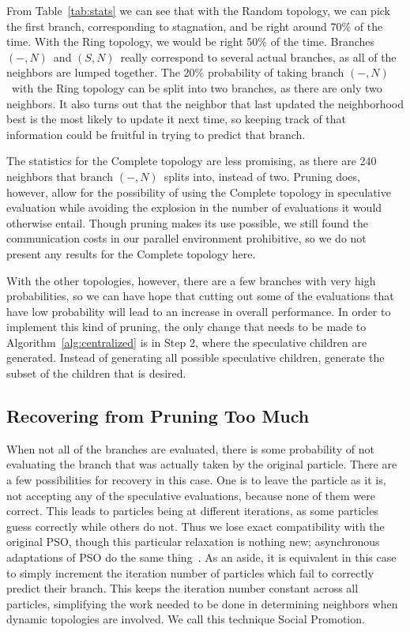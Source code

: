 \documentclass[journal,letterpaper]{IEEEtran}
\newcommand{\alg}[1]{Algorithm~\ref{alg:#1}}
\providecommand{\casepN}{\ensuremath{(-,N)}}
\providecommand{\casexN}{\ensuremath{(S,N)}}
\begin{document}
From Table~\ref{tab:stats} we can see that with the Random topology, we can
pick the first branch, corresponding to stagnation, and be right around 70\% of
the time.  With the Ring topology, we would be right 50\% of the time.
Branches \casepN\ and \casexN\ really correspond to several actual branches, as
all of the neighbors are lumped together.  The 20\% probability of taking
branch \casepN\ with the Ring topology can be split into two branches, as there
are only two neighbors.  It also turns out that the neighbor that last updated
the neighborhood best is the most likely to update it next time, so keeping
track of that information could be fruitful in trying to predict that branch.

The statistics for the Complete topology are less promising, as there are 240
neighbors that branch \casepN\ splits into, instead of two.  Pruning does,
however, allow for the possibility of using the Complete topology in
speculative evaluation while avoiding the explosion in the number of
evaluations it would otherwise entail.  Though pruning makes its use possible,
we still found the communication costs in our parallel environment prohibitive,
so we do not present any results for the Complete topology here.

With the other topologies, however, there are a few branches with very high
probabilities, so we can have hope that cutting out some of the evaluations
that have low probability will lead to an increase in overall performance.  In
order to implement this kind of pruning, the only change that needs to be made
to \alg{centralized} is in Step 2, where the speculative children are
generated.  Instead of generating all possible speculative children, generate
the subset of the children that is desired.

\subsection{Recovering from Pruning Too Much}
\label{sec:wrong}

When not all of the branches are evaluated, there is some probability of not
evaluating the branch that was actually taken by the original particle.  There
are a few possibilities for recovery in this case.  One is to leave the
particle as it is, not accepting any of the speculative evaluations, because
none of them were correct.  This leads to particles being at different
iterations, as some particles guess correctly while others do not.  Thus we
lose exact compatibility with the original PSO, though this particular
relaxation is nothing new; asynchronous adaptations of PSO do the same
thing~\cite{koh-2006-parallel-asynchronous-pso}.  As an aside, it is equivalent
in this case to simply increment the iteration number of particles which fail
to correctly predict their branch.  This keeps the iteration number constant
across all particles, simplifying the work needed to be done in determining
neighbors when dynamic topologies are involved.  We call this technique Social
Promotion.
\end{document}
